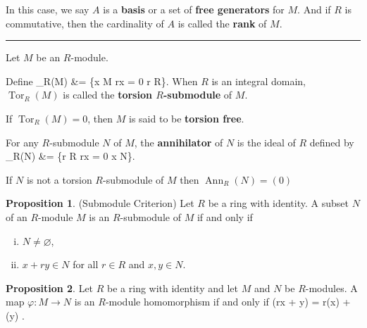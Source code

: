 \documentclass[12pt]{article}
\newcommand{\keyword}[1]{\textbf{#1}}
\def\[#1\]{\begin{align*}#1\end{align*}}
\newcommand{\sepline}{\rule{\textwidth}{0.4pt}}
\theoremstyle{definition}
\newtheorem{proposition}{Proposition}
\renewcommand{\phi}{\varphi}
\renewcommand{\emptyset}{\varnothing}
\newcommand{\<}{\left\langle}
\renewcommand{\>}{\right\rangle}
\DeclareMathOperator{\Tor}{Tor}
\DeclareMathOperator{\Ann}{Ann}
\DeclareMathOperator{\Ann}{Ann}
\begin{document}
In this case, we say $A$ is a \keyword{basis} or a set of \keyword{free generators} for $M$. And if $R$ is commutative, then the cardinality of $A$ is called the \keyword{rank} of $M$.

\sepline

Let $M$ be an $R$-module.

Define 
\[
    \Tor_R(M) &= \{x \in M \mid rx = 0  r \in R\}.
\]
When $R$ is an integral domain, $\Tor_R(M)$ is called the \keyword{torsion $R$-submodule} of $M$.

If $\Tor_R(M) = 0$, then $M$ is said to be \keyword{torsion free}.

For any $R$-submodule $N$ of $M$, the \keyword{annihilator} of $N$ is the ideal of $R$ defined by
\[
    \Ann_R(N) &= \{r \in R \mid rx = 0  x \in N\}.
\]

If $N$ is not a torsion $R$-submodule of $M$ then $\Ann_R(N) = (0)$









\newpage

\begin{proposition}(Submodule Criterion)
    Let $R$ be a ring with identity. A subset $N$ of an $R$-module $M$ is an $R$-submodule of $M$ if and only if
    \begin{enumerate}[(i)]
        \item $N \ne \emptyset$,
        \item $x + ry \in N$ for all $r \in R$ and $x, y \in N$.
    \end{enumerate}
\end{proposition}

\begin{proposition}
    Let $R$ be a ring with identity and let $M$ and $N$ be $R$-modules. A map $\phi : M \to N$ is an $R$-module homomorphism if and only if
    \[
        \phi(rx + y) = r\phi(x) + \phi(y) .
    \]
\end{proposition}
\end{document}
